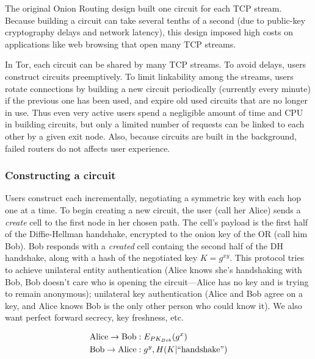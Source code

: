 \documentclass[times,10pt,twocolumn]{article}
\begin{document}
\label{subsec:circuits}


The original Onion Routing design built one circuit for each
TCP stream.  Because building a circuit can take several tenths of a
second (due to public-key cryptography delays and network latency),
this design imposed high costs on applications like web browsing that
open many TCP streams.

In Tor, each circuit can be shared by many TCP streams.  To avoid
delays, users construct circuits preemptively.  To limit linkability
among the streams, users rotate connections by building a new circuit
periodically (currently every minute) if the previous one has been
used, and expire old used circuits that are no longer in use. Thus
even very active users spend a negligible amount of time and CPU in
building circuits, but only a limited number of requests can be linked
to each other by a given exit node. Also, because circuits are built
in the background, failed routers do not affects user experience.

\subsubsection{Constructing a circuit}

Users construct each incrementally, negotiating a symmetric key with
each hop one at a time. To begin creating a new circuit, the user
(call her Alice) sends a \emph{create} cell to the first node in her
chosen path. The cell's payload is the first half of the
Diffie-Hellman handshake, encrypted to the onion key of the OR (call
him Bob). Bob responds with a \emph{created} cell containg the second
half of the DH handshake, along with a hash of the negotiated key
$K=g^{xy}$.  This protocol tries to achieve unilateral entity
authentication (Alice knows she's handshaking with Bob, Bob doesn't
care who is opening the circuit---Alice has no key and is trying to
remain anonymous); unilateral key authentication (Alice and Bob
agree on a key, and Alice knows Bob is the only other person who could
know it).  We also want perfect forward
secrecy, key freshness, etc.

\begin{equation}
\begin{aligned}
\mathrm{Alice} \rightarrow \mathrm{Bob}&: E_{PK_{Bob}}(g^x) \\
\mathrm{Bob} \rightarrow \mathrm{Alice}&: g^y, H(K | \mathrm{``handshake"}) \\
\end{aligned}
\end{equation}
\end{document}
